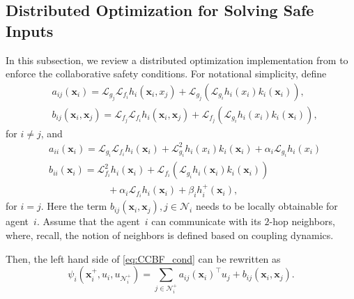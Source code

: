 \documentclass[letterpaper, 10 pt, conference]{ieeeconf}  %
\theoremstyle{plain}
\begin{document}
\subsection{Distributed Optimization for Solving Safe Inputs}
In this subsection, we review a distributed optimization implementation from \cite{xiao2025continuous} to enforce the collaborative safety conditions. 
For notational simplicity, define
\begin{equation*}
\begin{aligned}
    & a_{ij}(\mathbf{x}_i) = \mathcal{L}_{g_j} \mathcal{L}_{f_i}  h_i(\mathbf{x}_i, x_j) +  \mathcal{L}_{g_j} (\mathcal{L}_{g_i}  h_i(x_i) k_i(\mathbf{x}_i)), \\
    & b_{ij}(\mathbf{x}_i,\mathbf{x}_j) = \mathcal{L}_{f_j} \mathcal{L}_{f_i}  h_i(\mathbf{x}_i, \mathbf{x}_j) +  \mathcal{L}_{f_j} (\mathcal{L}_{g_i}  h_i(x_i) k_i(\mathbf{x}_i)),
    \end{aligned}
\end{equation*}
for $i \neq j$, and
\begin{equation*}
    \begin{aligned}
    & a_{ii}(\mathbf{x}_i) = \mathcal{L}_{g_i} \mathcal{L}_{f_i}  h_i(\mathbf{x}_i) + \mathcal{L}_{g_i}^2  h_i(x_i) k_i(\mathbf{x}_i) + \alpha_i \mathcal{L}_{g_i}h_i(x_i) \\
        & b_{ii}(\mathbf{x}_i) = \mathcal{L}^2_{f_i} h_i(\mathbf{x}_i) + \mathcal{L}_{f_i} (\mathcal{L}_{g_i}  h_i(\mathbf{x}_i) k_i(\mathbf{x}_i)) \\
        &
        \quad \quad \quad \quad \quad \quad 
        + \alpha_i \mathcal{L}_{f_i}  h_i(\mathbf{x}_i) + \beta_i h_i^+(\mathbf{x}_i),
    \end{aligned}
\end{equation*}
for $i = j$. Here the term $ b_{ij}(\mathbf{x}_i,\mathbf{x}_j), j\in \mathcal{N}_i$ needs to be locally obtainable for agent~$i$. Assume that the agent~$i$ can communicate with its $2$-hop neighbors, where, recall, the notion of neighbors is defined based on coupling dynamics.

Then, the left hand side of \eqref{eq:CCBF_cond} can be rewritten as
\begin{equation}\label{eq:collab_safety_cond}
    \psi_i(\mathbf{x}_i^+,u_i,u_{\mathcal{N}_i^+}) = \sum_{j \in \mathcal{N}_i^+} a_{ij}(\mathbf{x}_i)^\top u_j  +  b_{ij}(\mathbf{x}_i,\mathbf{x}_j).
\end{equation}
\end{document}

